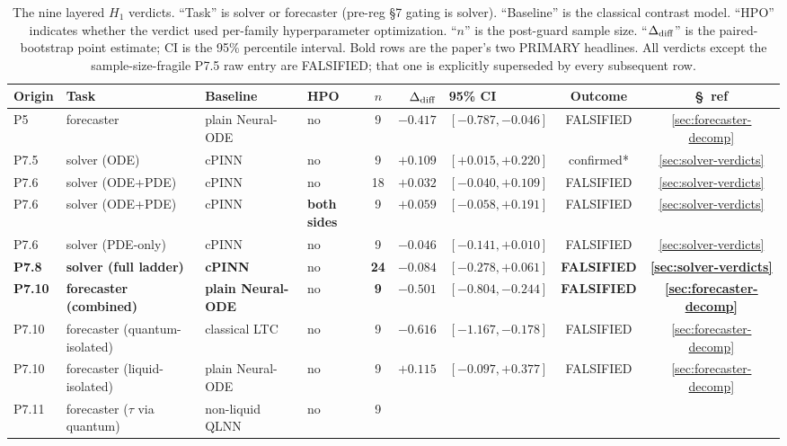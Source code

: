 \begin{table}[t]
\centering
\caption{The nine layered $H_1$ verdicts. ``Task'' is solver or
forecaster (pre-reg \S7 gating is solver). ``Baseline'' is the
classical contrast model. ``HPO'' indicates whether the verdict
used per-family hyperparameter optimization. ``$n$'' is the
post-guard sample size. ``$\Delta_{\mathrm{diff}}$'' is the paired-bootstrap
point estimate; CI is the 95\% percentile interval. Bold rows are
the paper's two PRIMARY headlines. All verdicts except the
sample-size-fragile P7.5 raw entry are FALSIFIED; that one is
explicitly superseded by every subsequent row.}
\label{tab:master-verdicts}
\scriptsize
\setlength{\tabcolsep}{4pt}
\begin{tabular}{llllcrlcc}
\toprule
Origin & Task & Baseline & HPO & $n$ & $\Delta_{\mathrm{diff}}$ & 95\% CI &
Outcome & §~ref \\
\midrule
P5 & forecaster & plain Neural-ODE & no & 9 & $-0.417$ &
  $[-0.787, -0.046]$ & FALSIFIED & \ref{sec:forecaster-decomp} \\
P7.5 & solver (ODE) & cPINN & no & 9 & $+0.109$ &
  $[+0.015, +0.220]$ & confirmed* & \ref{sec:solver-verdicts} \\
P7.6 & solver (ODE+PDE) & cPINN & no & 18 & $+0.032$ &
  $[-0.040, +0.109]$ & FALSIFIED & \ref{sec:solver-verdicts} \\
P7.6 & solver (ODE+PDE) & cPINN & \textbf{both sides} & 9 & $+0.059$ &
  $[-0.058, +0.191]$ & FALSIFIED & \ref{sec:solver-verdicts} \\
P7.6 & solver (PDE-only) & cPINN & no & 9 & $-0.046$ &
  $[-0.141, +0.010]$ & FALSIFIED & \ref{sec:solver-verdicts} \\
\textbf{P7.8} & \textbf{solver (full ladder)} & \textbf{cPINN} &
  no & \textbf{24} & $\mathbf{-0.084}$ &
  $\mathbf{[-0.278, +0.061]}$ & \textbf{FALSIFIED} &
  \textbf{\ref{sec:solver-verdicts}} \\
\textbf{P7.10} & \textbf{forecaster (combined)} & \textbf{plain Neural-ODE} &
  no & \textbf{9} & $\mathbf{-0.501}$ &
  $\mathbf{[-0.804, -0.244]}$ & \textbf{FALSIFIED} &
  \textbf{\ref{sec:forecaster-decomp}} \\
P7.10 & forecaster (quantum-isolated) & classical LTC & no & 9 &
  $-0.616$ & $[-1.167, -0.178]$ & FALSIFIED &
  \ref{sec:forecaster-decomp} \\
P7.10 & forecaster (liquid-isolated) & plain Neural-ODE & no & 9 &
  $+0.115$ & $[-0.097, +0.377]$ & FALSIFIED &
  \ref{sec:forecaster-decomp} \\
P7.11 & forecaster ($\tau$ via quantum) & non-liquid QLNN & no & 9 &

\end{tabular}
\end{table}
